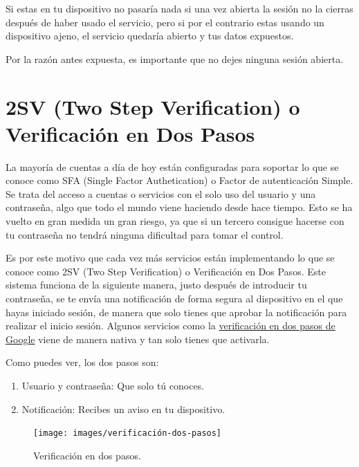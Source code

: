 \documentclass[
  spanish,
  a4paper,
  openany]{book}
\providecommand{\tightlist}{%
  \setlength{\itemsep}{0pt}\setlength{\parskip}{0pt}}
\begin{document}
Si estas en tu dispositivo no pasaría nada si una vez abierta la sesión no la cierras después de haber usado el servicio, pero si por el contrario estas usando un dispositivo ajeno, el servicio quedaría abierto y tus datos expuestos.

Por la razón antes expuesta, es importante que no dejes ninguna sesión abierta.

\hypertarget{sv-two-step-verification-o-verificaciuxf3n-en-dos-pasos}{%
\section{2SV (Two Step Verification) o Verificación en Dos Pasos}\label{sv-two-step-verification-o-verificaciuxf3n-en-dos-pasos}}

La mayoría de cuentas a día de hoy están configuradas para soportar lo que se conoce como SFA (Single Factor Authetication) o Factor de autenticación Simple. Se trata del acceso a cuentas o servicios con el solo uso del usuario y una contraseña, algo que todo el mundo viene haciendo desde hace tiempo. Esto se ha vuelto en gran medida un gran riesgo, ya que si un tercero consigue hacerse con tu contraseña no tendrá ninguna dificultad para tomar el control.

Es por este motivo que cada vez más servicios están implementando lo que se conoce como 2SV (Two Step Verification) o Verificación en Dos Pasos. Este sistema funciona de la siguiente manera, justo después de introducir tu contraseña, se te envía una notificación de forma segura al dispositivo en el que hayas iniciado sesión, de manera que solo tienes que aprobar la notificación para realizar el inicio sesión. Algunos servicios como la \href{https://support.google.com/accounts/answer/185839?co=GENIE.Platform\%3DDesktop\&hl=es}{verificación en dos pasos de Google} viene de manera nativa y tan solo tienes que activarla.

Como puedes ver, los dos pasos son:

\begin{enumerate}
\def\labelenumi{\arabic{enumi}.}
\tightlist
\item
  Usuario y contraseña: Que solo tú conoces.
\item
  Notificación: Recibes un aviso en tu dispositivo.
\end{enumerate}

\begin{figure}

{\centering \texttt{[image: images/verificación-dos-pasos]} 

}

\caption{Verificación en dos pasos.}\label{fig:unnamed-chunk-13}
\end{figure}
\end{document}
